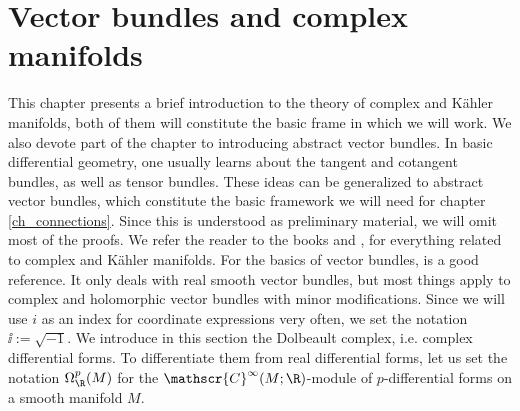 \chapter{Vector bundles and complex manifolds} \label{appendix_Kahler}
This chapter presents a brief introduction to the theory of complex and Kähler manifolds, both of them will constitute the basic frame in which we will work. We also devote part of the chapter to introducing abstract vector bundles. In basic differential geometry, one usually learns about the tangent and cotangent bundles, as well as tensor bundles. These ideas can be generalized to abstract vector bundles, which constitute the basic framework we will need for chapter \ref{ch_connections}. Since this is understood as preliminary material, we will omit most of the proofs. We refer the reader to the books \parencite{lee_introCM} and \parencite{huybrechts2005complex}, for everything related to complex and Kähler manifolds. For the basics of vector bundles, \parencite[Ch. 10]{lee_introSM} is a good reference. It only deals with real smooth vector bundles, but most things apply to complex and holomorphic vector bundles with minor modifications. Since we will use \(i\) as an index for coordinate expressions very often, we set the notation \(\ii:=\sqrt{-1}\). We introduce in this section the Dolbeault complex, i.e. complex differential forms. To differentiate them from real differential forms, let us set the notation \(\Omega_\R^p(M)\) for the \(\mathscr{C}^\infty(M;\R)\)-module of \(p\)-differential forms on a smooth manifold \(M\).

